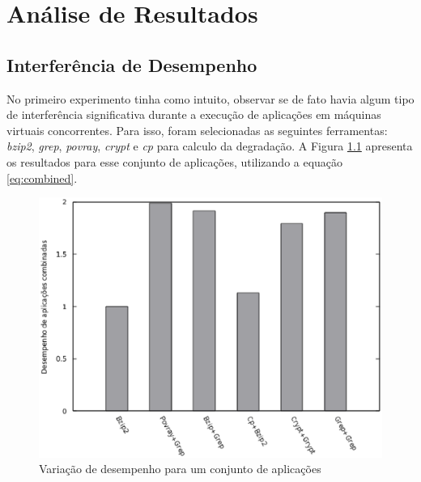 \chapter{Análise de Resultados}
\label{cap:resultados}

\section{Interferência de Desempenho}
No primeiro experimento tinha como intuito, observar se de fato havia algum tipo de interferência significativa durante a execução de aplicações em máquinas virtuais concorrentes. Para isso, foram selecionadas as seguintes ferramentas: \textit{bzip2}, \textit{grep}, \textit{povray}, \textit{crypt} e \textit{cp} para calculo da degradação. A Figura \ref{first_experiment} apresenta os resultados para esse conjunto de aplicações, utilizando a equação \ref{eq:combined}. 

\begin{figure}[!htb]
\centering
\includegraphics [keepaspectratio=true,scale=0.65]{graficos/exp1.eps}
\caption{Variação de desempenho para um conjunto de aplicações}
\label{first_experiment}
\end{figure} 

